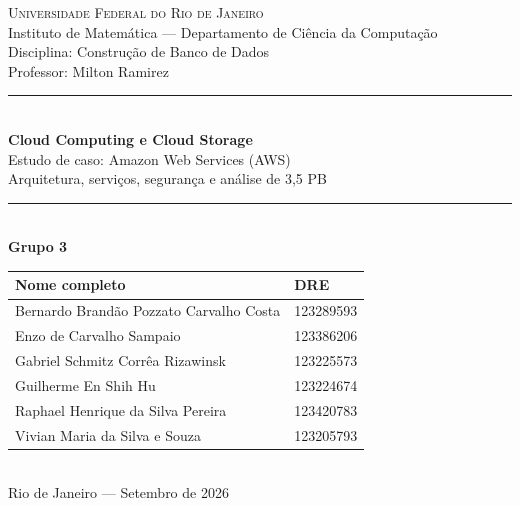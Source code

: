 \documentclass[11pt,a4paper]{article}
\newcommand{\numerogrupo}{3}
\begin{document}
\thispagestyle{empty}
\begin{center}
{\large\scshape Universidade Federal do Rio de Janeiro}\\[2pt]
{\normalsize Instituto de Matemática --- Departamento de Ciência da Computação}\\[2pt]
{\normalsize Disciplina: Construção de Banco de Dados}\\[2pt]
{\normalsize Professor: Milton Ramirez}\\[17mm]
{\color{azul}\rule{\textwidth}{1.2pt}}\\[6mm]
{\LARGE\bfseries Cloud Computing e Cloud Storage}\\[4mm]
{\Large Estudo de caso: Amazon Web Services (AWS)}\\[4mm]
{\large Arquitetura, serviços, segurança e análise de 3,5 PB}\\[6mm]
{\color{azul}\rule{\textwidth}{1.2pt}}\\[8mm]
{\large\bfseries Grupo \numerogrupo}\\[6mm]
\begin{tabular}{@{}ll@{}}\toprule
\textbf{Nome completo} & \textbf{DRE}\\\midrule
Bernardo Brandão Pozzato Carvalho Costa & 123289593\\
Enzo de Carvalho Sampaio & 123386206\\
Gabriel Schmitz Corrêa Rizawinsk & 123225573\\
Guilherme En Shih Hu & 123224674\\
Raphael Henrique da Silva Pereira & 123420783\\
Vivian Maria da Silva e Souza & 123205793\\\bottomrule
\end{tabular}\\[12mm]
{\normalsize Rio de Janeiro --- Setembro de 2026}
\end{center}
\clearpage
\tableofcontents
\clearpage
\end{document}
